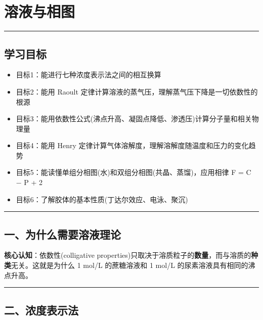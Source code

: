 \section{溶液与相图}\label{ux6eb6ux6db2ux4e0eux76f8ux56fe}

\begin{center}\rule{0.5\linewidth}{0.5pt}\end{center}

\subsection{学习目标}\label{ux5b66ux4e60ux76eeux6807}

\begin{itemize}
\tightlist
\item
  目标1：能进行七种浓度表示法之间的相互换算
\item
  目标2：能用 Raoult 定律计算溶液的蒸气压，理解蒸气压下降是一切依数性的根源
\item
  目标3：能用依数性公式(沸点升高、凝固点降低、渗透压)计算分子量和相关物理量
\item
  目标4：能用 Henry 定律计算气体溶解度，理解溶解度随温度和压力的变化趋势
\item
  目标5：能读懂单组分相图(水)和双组分相图(共晶、蒸馏)，应用相律 F = C − P + 2
\item
  目标6：了解胶体的基本性质(丁达尔效应、电泳、聚沉)
\end{itemize}

\begin{center}\rule{0.5\linewidth}{0.5pt}\end{center}

\subsection{一、为什么需要溶液理论}\label{ux4e00ux4e3aux4ec0ux4e48ux9700ux8981ux6eb6ux6db2ux7406ux8bba}

\textbf{核心认知}：依数性(colligative properties)只取决于溶质粒子的\textbf{数量}，而与溶质的\textbf{种类}无关。这就是为什么 1 mol/L 的蔗糖溶液和 1 mol/L 的尿素溶液具有相同的沸点升高。

\begin{center}\rule{0.5\linewidth}{0.5pt}\end{center}

\subsection{二、浓度表示法}\label{ux4e8cux6d53ux5ea6ux8868ux793aux6cd5}

